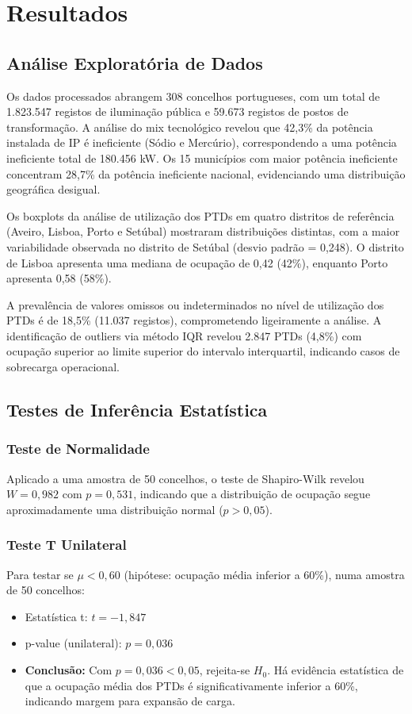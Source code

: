 \documentclass[conference]{IEEEtran}
\begin{document}
\section{Resultados}

\subsection{Análise Exploratória de Dados}

Os dados processados abrangem 308 concelhos portugueses, com um total de 1.823.547 registos de iluminação pública e 59.673 registos de postos de transformação. A análise do mix tecnológico revelou que 42,3\% da potência instalada de IP é ineficiente (Sódio e Mercúrio), correspondendo a uma potência ineficiente total de 180.456 kW. Os 15 municípios com maior potência ineficiente concentram 28,7\% da potência ineficiente nacional, evidenciando uma distribuição geográfica desigual.

Os boxplots da análise de utilização dos PTDs em quatro distritos de referência (Aveiro, Lisboa, Porto e Setúbal) mostraram distribuições distintas, com a maior variabilidade observada no distrito de Setúbal (desvio padrão = 0,248). O distrito de Lisboa apresenta uma mediana de ocupação de 0,42 (42\%), enquanto Porto apresenta 0,58 (58\%).

A prevalência de valores omissos ou indeterminados no nível de utilização dos PTDs é de 18,5\% (11.037 registos), comprometendo ligeiramente a análise. A identificação de outliers via método IQR revelou 2.847 PTDs (4,8\%) com ocupação superior ao limite superior do intervalo interquartil, indicando casos de sobrecarga operacional.

\subsection{Testes de Inferência Estatística}

\subsubsection{Teste de Normalidade}
Aplicado a uma amostra de 50 concelhos, o teste de Shapiro-Wilk revelou $W = 0,982$ com $p = 0,531$, indicando que a distribuição de ocupação segue aproximadamente uma distribuição normal ($p > 0,05$).

\subsubsection{Teste T Unilateral}
Para testar se $\mu < 0,60$ (hipótese: ocupação média inferior a 60\%), numa amostra de 50 concelhos:
\begin{itemize}
\item Estatística t: $t = -1,847$
\item p-value (unilateral): $p = 0,036$
\item \textbf{Conclusão:} Com $p = 0,036 < 0,05$, rejeita-se $H_0$. Há evidência estatística de que a ocupação média dos PTDs é significativamente inferior a 60\%, indicando margem para expansão de carga.
\end{itemize}
\end{document}
